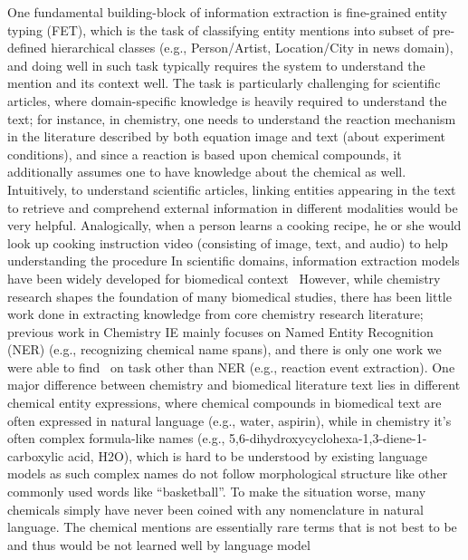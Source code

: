 One fundamental building-block of information extraction is fine-grained entity typing (FET), which is the task of classifying entity mentions into subset of pre-defined hierarchical classes (e.g., Person/Artist, Location/City in news domain), and doing well in such task typically requires the system to understand the mention and its context well.
The task is particularly challenging for scientific articles, where domain-specific knowledge is heavily required to understand the text; for instance, in chemistry, one needs to understand the reaction mechanism in the literature described by both equation image and text (about experiment conditions), and since a reaction is based upon chemical compounds, it additionally assumes one to have knowledge about the chemical as well. Intuitively, to understand scientific articles, linking entities appearing in the text to retrieve and comprehend external information in different modalities would be very helpful. Analogically, when a person learns a cooking recipe, he or she would look up cooking instruction video (consisting of image, text, and audio) to help understanding the procedure In scientific domains, information extraction models have been widely developed for biomedical context~\cite{biomedie, biomedpp1, biomedpp2, biomedpp3, biomedpp4, scibert,biobert, biomedpp5,biomedpp6}  However, while chemistry research shapes the foundation of many biomedical studies, there has been little work done in extracting knowledge from core chemistry research literature; previous work in Chemistry IE mainly focuses on Named Entity Recognition (NER) (e.g., recognizing chemical name spans), and there is only one work we were able to find~\cite{chemu} on task other than NER (e.g., reaction event extraction). One major difference between chemistry and biomedical literature text lies in different chemical entity expressions, where chemical compounds in biomedical text are often expressed in natural language (e.g., water, aspirin), while in chemistry it's often complex formula-like names (e.g., 5,6-dihydroxycyclohexa-1,3-diene-1-carboxylic acid, H2O), which is hard to be understood by existing language models as such complex names do not follow morphological structure like other commonly used words like ``basketball''. To make the situation worse, many chemicals simply have never been coined with any nomenclature in natural language. The chemical mentions are essentially rare terms that is not best to be  and thus would be not learned well by language model  


